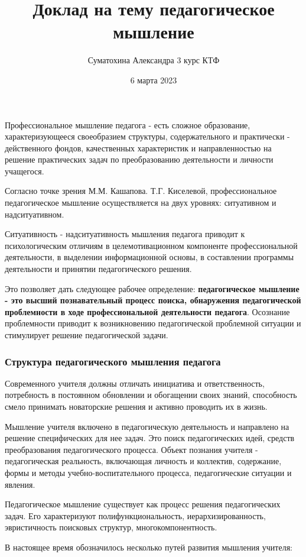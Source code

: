 \documentclass[a4paper, 12pt]{extarticle}
\title{Доклад на тему педагогическое мышление}
\author{Суматохина Александра 3 курс КТФ}
\date{6 марта 2023}
\begin{document}
\maketitle

Профессиональное мышление педагога - есть сложное образование, характеризующееся своеобразием структуры, содержательного и практически - действенного фондов, качественных характеристик и направленностью на решение практических задач по преобразованию деятельности и личности учащегося.

Согласно точке зрения М.М. Кашапова. Т.Г. Киселевой, профессиональное педагогическое мышление осуществляется на двух уровнях: ситуативном и надситуативном. 

Ситуативность - надситуативность мышления педагога приводит к психологическим отличиям в целемотивационном компоненте профессиональной деятельности, в выделении информационной основы, в составлении программы деятельности и принятии педагогического решения.

Это позволяет дать следующее рабочее определение: \textbf{педагогическое мышление - это высший познавательный процесс поиска, обнаружения педагогической проблемности в ходе профессиональной деятельности педагога}. Осознание проблемности приводит к возникновению педагогической проблемной ситуации и стимулирует решение педагогической задачи.

\subsubsection*{Структура педагогического мышления педагога}

Современного учителя должны отличать инициатива и ответственность, потребность в постоянном обновлении и обогащении своих знаний, способность смело принимать новаторские решения и активно проводить их в жизнь.

Мышление учителя включено в педагогическую деятельность и направлено на решение специфических для нее задач. Это поиск педагогических идей, средств преобразования педагогического процесса. Объект познания учителя - педагогическая реальность, включающая личность и коллектив, содержание, формы и методы учебно-воспитательного процесса, педагогические ситуации и явления.

Педагогическое мышление существует как процесс решения педагогических задач. Его характеризуют полифункциональность, иерархизированность, эвристичность поисковых структур, многокомпонентность.

В настоящее время обозначилось несколько путей развития мышления учителя: 
\end{document}
